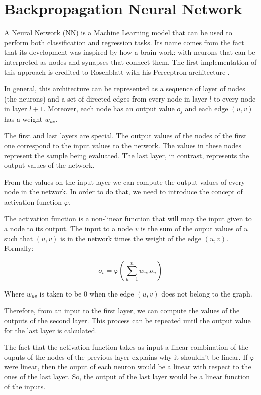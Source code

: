 \section{Backpropagation Neural Network}\label{sec:BackpropagationNeuralNetwork}

A Neural Network (NN) is a Machine Learning model that can be used to perform both classification and regression tasks.
Its name comes from the fact that its development was inspired by how a brain work: with neurons that can be interpreted as nodes and synapses that connect them.
The first implementation of this approach is credited to Rosenblatt with his Perceptron architecture \cite{rosenblatt1957perceptron}.

In general, this architecture can be represented as a sequence of layer of nodes (the neurons) and a set of directed edges from every node in layer $l$ to every node in layer $l+1$.
Moreover, each node has an output value $o_j$ and each edge $(u, v)$ has a weight $w_{uv}$.

The first and last layers are special.
The output values of the nodes of the first one correspond to the input values to the network.
The values in these nodes represent the sample being evaluated.
The last layer, in contrast, represents the output values of the network.

From the values on the input layer we can compute the output values of every node in the network.
In order to do that, we need to introduce the concept of activation function $\varphi$.

The activation function is a non-linear function that will map the input given to a node to its output.
The input to a node $v$ is the sum of the ouput values of $u$ such that $(u, v)$ is in the network times the weight of the edge $(u,v)$.
Formally:

$$
o_v = \varphi\left(\sum_{u=1}^{n} w_{uv} o_u\right)
$$

Where $w_{uv}$ is taken to be 0 when the edge $(u, v)$ does not belong to the graph.

Therefore, from an input to the first layer, we can compute the values of the outputs of the second layer.
This process can be repeated until the output value for the last layer is calculated.

The fact that the activation function takes as input a linear combination of the ouputs of the nodes of the previous layer explains why it shouldn't be linear.
If $\varphi$ were linear, then the ouput of each neuron would be a linear with respect to the ones of the last layer.
So, the output of the last layer would be a linear function of the inputs.

